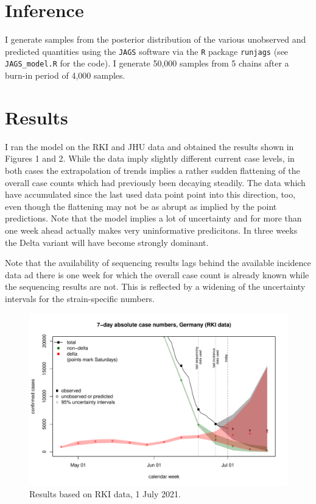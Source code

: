 \documentclass{article}
\begin{document}
\section{Inference}

I generate samples from the posterior distribution of the various unobserved and predicted quantities using the \texttt{JAGS} software via the \texttt{R} package \texttt{runjags} (see \texttt{JAGS\_model.R} for the code). I generate 50,000 samples from 5 chains after a burn-in period of 4,000 samples.

\section{Results}

I ran the model on the RKI and JHU data and obtained the results shown in Figures 1 and 2. While the data imply slightly different current case levels, in both cases the extrapolation of trends implies a rather sudden flattening of the overall case counts which had previously been decaying steadily. The data which have accumulated since the last used data point point into this direction, too, even though the flattening may not be as abrupt as implied by the point predictions. Note that the model implies a lot of uncertainty and for more than one week ahead actually makes very uninformative predicitons. In three weeks the Delta variant will have become strongly dominant.

Note that the availability of sequencing results lags behind the available incidence data ad there is one week for which the overall case count is already known while the sequencing results are not. This is reflected by a widening of the uncertainty intervals for the strain-specific numbers.

\begin{figure}
\center
\includegraphics[scale=0.6]{plots/plot_RKI_2021-07-01.pdf}
\caption{Results based on RKI data, 1 July 2021.}
\end{figure}
\end{document}
